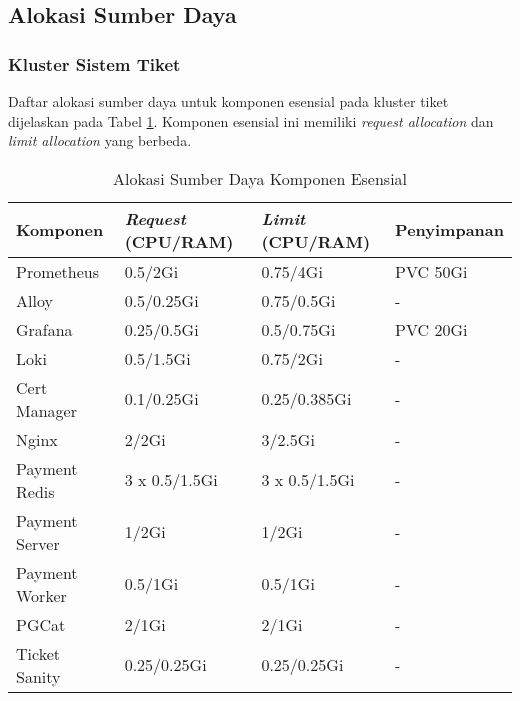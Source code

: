 \subsection{Alokasi Sumber Daya}

\subsubsection{Kluster Sistem Tiket}

Daftar alokasi sumber daya untuk komponen esensial pada kluster tiket dijelaskan pada Tabel \ref{tab:resource_allocation}. Komponen esensial ini memiliki \textit{request allocation} dan \textit{limit allocation} yang berbeda.

\begin{table}[htpb]
    \centering
    \caption{Alokasi Sumber Daya Komponen Esensial}
    \label{tab:resource_allocation}
    \begin{tabular}{|l|l|l|l|}
        \hline
        \textbf{Komponen} & \textbf{\textit{Request} (CPU/RAM)} & \textbf{\textit{Limit} (CPU/RAM)} & \textbf{Penyimpanan} \\ \hline
        Prometheus        & 0.5/2Gi                             & 0.75/4Gi                          & PVC 50Gi             \\ \hline
        Alloy             & 0.5/0.25Gi                          & 0.75/0.5Gi                        & -                    \\ \hline
        Grafana           & 0.25/0.5Gi                          & 0.5/0.75Gi                        & PVC 20Gi             \\ \hline
        Loki              & 0.5/1.5Gi                           & 0.75/2Gi                          & -                    \\ \hline
        Cert Manager      & 0.1/0.25Gi                          & 0.25/0.385Gi                      & -                    \\ \hline
        Nginx             & 2/2Gi                               & 3/2.5Gi                           & -                    \\ \hline
        Payment Redis     & 3 x 0.5/1.5Gi                       & 3 x 0.5/1.5Gi                     & -                    \\ \hline
        Payment Server    & 1/2Gi                               & 1/2Gi                             & -                    \\ \hline
        Payment Worker    & 0.5/1Gi                             & 0.5/1Gi                           & -                    \\ \hline
        PGCat             & 2/1Gi                               & 2/1Gi                             & -                    \\ \hline
        Ticket Sanity     & 0.25/0.25Gi                         & 0.25/0.25Gi                       & -                    \\ \hline
    \end{tabular}
\end{table}

